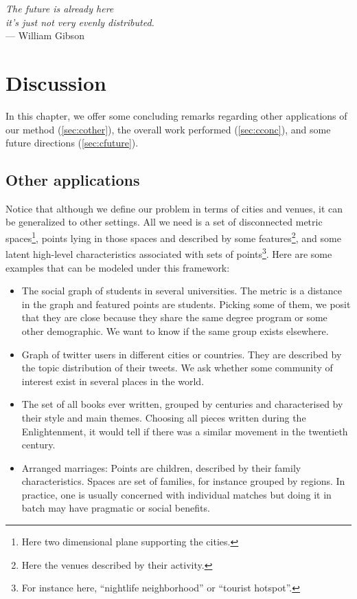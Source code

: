 \begin{flushright}{\slshape    
		The future is already here \\
		it's just not very evenly distributed.
    } \\ \medskip
    --- William Gibson
\end{flushright}

\bigskip

\begingroup
\let\clearpage\relax
\let\cleardoublepage\relax
\let\cleardoublepage\relax
\chapter{Discussion}
\label{chap:discussion}

In this chapter, we offer some concluding remarks regarding other applications
of our method (\autoref{sec:cother}), the overall work performed
(\autoref{sec:cconc}), and some future directions (\autoref{sec:cfuture}).

\section{Other applications}
\label{sec:cother}

Notice that although we define our problem in terms of cities and venues, it can
be generalized to other settings. All we need is a set of disconnected metric
spaces\footnote{Here two dimensional plane supporting the cities.}, points
lying in those spaces and described by some features\footnote{Here the venues
described by their activity.}, and some latent high-level characteristics
associated with sets of points\footnote{For instance here, \enquote{nightlife
neighborhood} or \enquote{tourist hotspot}.}. Here are some examples that
can be modeled under this framework:
\begin{itemize}
	\label{:more-problems}
	\item The social graph of students in several universities. The metric
		is a distance in the graph and featured points are students.
		Picking some of them, we posit that they are close because
		they share the same degree program or some other demographic.
		We want to know if the same group exists elsewhere.
	\item Graph of twitter users in different cities or countries. They
		are described by the topic distribution of their tweets. We
		ask whether some community of interest exist in several places
		in the world.
	\item The set of all books ever written, grouped by centuries and
		characterised by their style and main themes. Choosing all
		pieces written during the Enlightenment, it would tell if
		there was a similar movement in the twentieth century.
	\item Arranged marriages: Points are children, described by their family
		characteristics. Spaces are set of families, for instance grouped by
		regions. In practice, one is usually concerned with individual matches
		 but doing it in batch may have pragmatic or social
		benefits.
\end{itemize}

